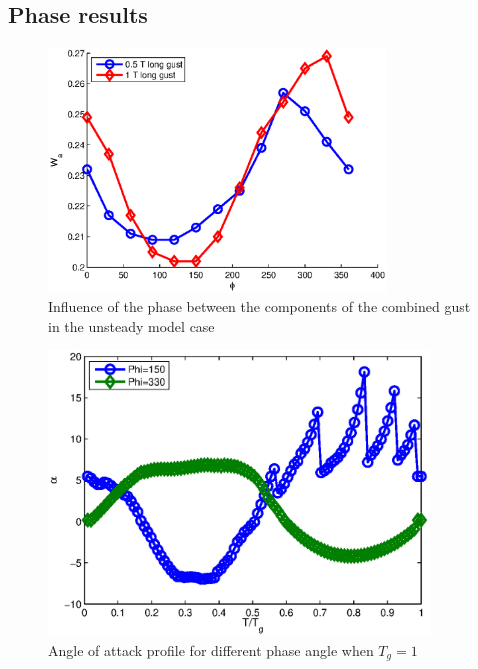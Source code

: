 \documentclass[compress]{beamer}
\begin{document}
\subsection{Phase results}

\begin{frame}
  \begin{figure}[h]
    \centering
    \includegraphics[width=0.8\textwidth]{./Figures/combined_gust_amplitude_vs_phase_GK.eps}
    \caption{Influence of the phase between the components of the combined gust in the unsteady model case}
  \end{figure}
\end{frame}

\begin{frame}
  \begin{figure}[h]
    \centering
    \includegraphics[width=0.9\textwidth]{./Figures/alpha_vs_Tg_GK_phi_Tg=1.eps}
    \caption{Angle of attack profile for different phase angle when $T_g=1$}
  \end{figure}
\end{frame}
\end{document}
